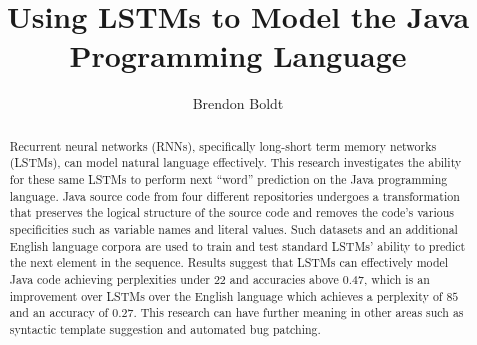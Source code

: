 \documentclass[runningheads,a4paper]{llncs}
\begin{document}
\mainmatter  %

\title{Using LSTMs to Model the Java Programming Language}


%
%
\author{Brendon Boldt}
%


%
%

\maketitle

\begin{abstract} 
Recurrent neural networks (RNNs), specifically long-short term memory 
networks (LSTMs), can model natural language effectively. This research 
investigates the ability for these same LSTMs to perform next ``word'' 
prediction on the Java programming 
language. Java source code from four different repositories
undergoes a transformation that preserves the logical structure of the 
source code and removes the code's various specificities such as 
variable names and literal values. Such datasets and an additional English 
language corpora are used to train and test standard LSTMs' ability to predict
the next element in the sequence. 
Results suggest that LSTMs can effectively model
Java code achieving perplexities under $22$ and accuracies above $0.47$, which
is an improvement over LSTMs over the English language which achieves a 
perplexity of $85$ and an accuracy of $0.27$. This research can have further
meaning in other areas such as syntactic template suggestion and automated bug
patching.
\end{abstract} 
\end{document}
